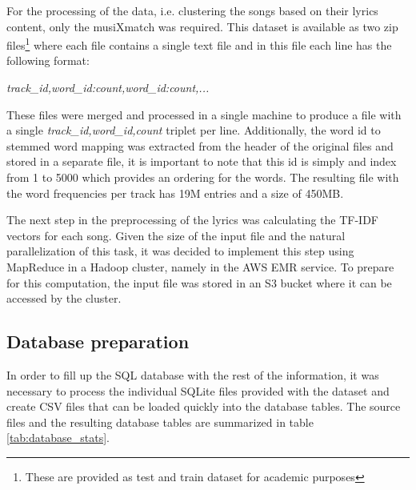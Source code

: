 \documentclass[10pt,a4paper, twocolumn]{article}
\begin{document}
    For the processing of the data, i.e. clustering the songs based on their
    lyrics content, only the musiXmatch was required. This dataset is available
    as two zip files\footnote{These are provided as test and train dataset for
    academic purposes} where each file contains a single text file and in this
    file each line has the following format:
    
    \emph{track\_id,word\_id:count,word\_id:count,...}
    
    These files were merged and processed in a single machine to produce a file
    with a single 
    \emph{track\_id,word\_id,count} triplet per line. Additionally, the word id
    to stemmed word mapping was extracted from the header of the original files
    and stored in a separate file, it is important to note that this id is simply
    and index from 1 to 5000 which provides an ordering for the words.
    The resulting file with the word frequencies per track has 19M entries and a
    size of 450MB.
    
    The next step in the preprocessing of the lyrics was calculating the
    TF-IDF vectors for each song. Given the size of the input file and the
    natural parallelization of this task, it was decided to implement this
    step using MapReduce in a Hadoop cluster, namely in the AWS EMR service.
    To prepare for this computation, the input file was stored in an S3 bucket
    where it can be accessed by the cluster.
  
	  \subsection{Database preparation}
	
	  In order to fill up the SQL database with the rest of the information, it was
	  necessary to process the individual SQLite files provided with the dataset
	  and create CSV files that can be loaded quickly into the database tables.
	  The source files and the resulting database tables are summarized in table
	  \ref{tab:database_stats}.
	  
\end{document}
